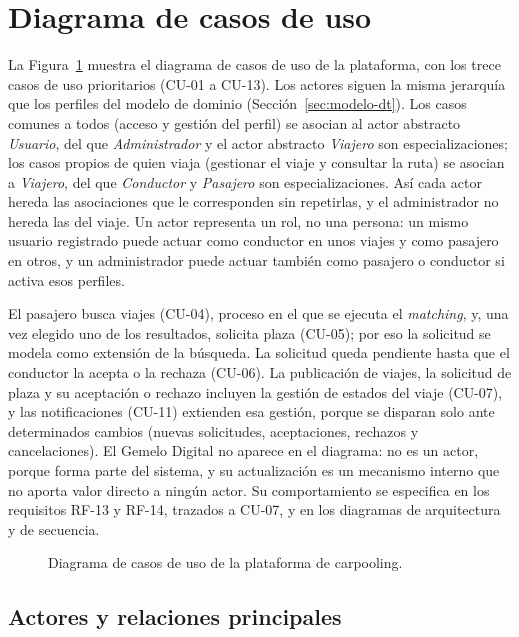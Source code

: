 \section{Diagrama de casos de uso}

La Figura~\ref{fig:casos-uso} muestra el diagrama de casos de uso de la plataforma, con los trece casos de uso prioritarios (CU-01 a CU-13). Los actores siguen la misma jerarquía que los perfiles del modelo de dominio (Sección~\ref{sec:modelo-dt}). Los casos comunes a todos (acceso y gestión del perfil) se asocian al actor abstracto \textit{Usuario}, del que \textit{Administrador} y el actor abstracto \textit{Viajero} son especializaciones; los casos propios de quien viaja (gestionar el viaje y consultar la ruta) se asocian a \textit{Viajero}, del que \textit{Conductor} y \textit{Pasajero} son especializaciones. Así cada actor hereda las asociaciones que le corresponden sin repetirlas, y el administrador no hereda las del viaje. Un actor representa un rol, no una persona: un mismo usuario registrado puede actuar como conductor en unos viajes y como pasajero en otros, y un administrador puede actuar también como pasajero o conductor si activa esos perfiles.

El pasajero busca viajes (CU-04), proceso en el que se ejecuta el \textit{matching}, y, una vez elegido uno de los resultados, solicita plaza (CU-05); por eso la solicitud se modela como extensión de la búsqueda. La solicitud queda pendiente hasta que el conductor la acepta o la rechaza (CU-06). La publicación de viajes, la solicitud de plaza y su aceptación o rechazo incluyen la gestión de estados del viaje (CU-07), y las notificaciones (CU-11) extienden esa gestión, porque se disparan solo ante determinados cambios (nuevas solicitudes, aceptaciones, rechazos y cancelaciones). El Gemelo Digital no aparece en el diagrama: no es un actor, porque forma parte del sistema, y su actualización es un mecanismo interno que no aporta valor directo a ningún actor. Su comportamiento se especifica en los requisitos RF-13 y RF-14, trazados a CU-07, y en los diagramas de arquitectura y de secuencia.

\begin{figure}[H]
  \centering
  \resizebox{\textwidth}{!}{}
  \caption{Diagrama de casos de uso de la plataforma de carpooling.}
  \label{fig:casos-uso}
\end{figure}

\subsection{Actores y relaciones principales}

